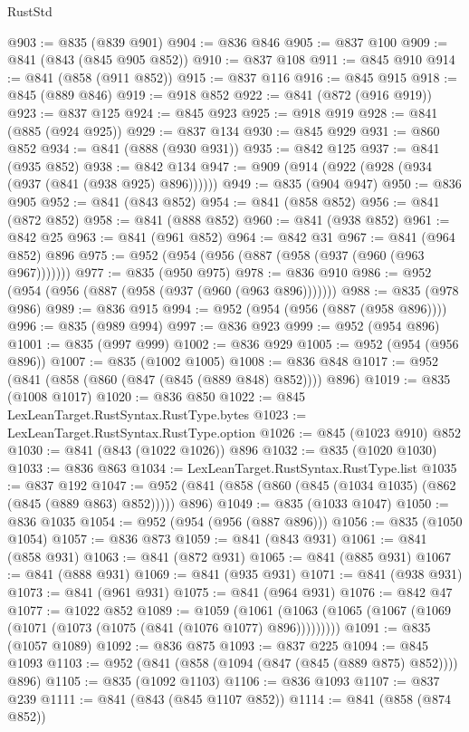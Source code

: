 \begin{lexlean}{RustStd}
\begin{coremodule}
@903 := @835 (@839 @901)
@904 := @836 @846
@905 := @837 @100
@909 := @841 (@843 (@845 @905 @852))
@910 := @837 @108
@911 := @845 @910
@914 := @841 (@858 (@911 @852))
@915 := @837 @116
@916 := @845 @915
@918 := @845 (@889 @846)
@919 := @918 @852
@922 := @841 (@872 (@916 @919))
@923 := @837 @125
@924 := @845 @923
@925 := @918 @919
@928 := @841 (@885 (@924 @925))
@929 := @837 @134
@930 := @845 @929
@931 := @860 @852
@934 := @841 (@888 (@930 @931))
@935 := @842 @125
@937 := @841 (@935 @852)
@938 := @842 @134
@947 := @909 (@914 (@922 (@928 (@934 (@937 (@841 (@938 @925) @896))))))
@949 := @835 (@904 @947)
@950 := @836 @905
@952 := @841 (@843 @852)
@954 := @841 (@858 @852)
@956 := @841 (@872 @852)
@958 := @841 (@888 @852)
@960 := @841 (@938 @852)
@961 := @842 @25
@963 := @841 (@961 @852)
@964 := @842 @31
@967 := @841 (@964 @852) @896
@975 := @952 (@954 (@956 (@887 (@958 (@937 (@960 (@963 @967)))))))
@977 := @835 (@950 @975)
@978 := @836 @910
@986 := @952 (@954 (@956 (@887 (@958 (@937 (@960 (@963 @896)))))))
@988 := @835 (@978 @986)
@989 := @836 @915
@994 := @952 (@954 (@956 (@887 (@958 @896))))
@996 := @835 (@989 @994)
@997 := @836 @923
@999 := @952 (@954 @896)
@1001 := @835 (@997 @999)
@1002 := @836 @929
@1005 := @952 (@954 (@956 @896))
@1007 := @835 (@1002 @1005)
@1008 := @836 @848
@1017 := @952 (@841 (@858 (@860 (@847 (@845 (@889 @848) @852)))) @896)
@1019 := @835 (@1008 @1017)
@1020 := @836 @850
@1022 := @845 LexLeanTarget.RustSyntax.RustType.bytes
@1023 := LexLeanTarget.RustSyntax.RustType.option
@1026 := @845 (@1023 @910) @852
@1030 := @841 (@843 (@1022 @1026)) @896
@1032 := @835 (@1020 @1030)
@1033 := @836 @863
@1034 := LexLeanTarget.RustSyntax.RustType.list
@1035 := @837 @192
@1047 := @952 (@841 (@858 (@860 (@845 (@1034 @1035) (@862 (@845 (@889 @863) @852))))) @896)
@1049 := @835 (@1033 @1047)
@1050 := @836 @1035
@1054 := @952 (@954 (@956 (@887 @896)))
@1056 := @835 (@1050 @1054)
@1057 := @836 @873
@1059 := @841 (@843 @931)
@1061 := @841 (@858 @931)
@1063 := @841 (@872 @931)
@1065 := @841 (@885 @931)
@1067 := @841 (@888 @931)
@1069 := @841 (@935 @931)
@1071 := @841 (@938 @931)
@1073 := @841 (@961 @931)
@1075 := @841 (@964 @931)
@1076 := @842 @47
@1077 := @1022 @852
@1089 := @1059
    (@1061 (@1063 (@1065 (@1067 (@1069 (@1071 (@1073 (@1075 (@841 (@1076 @1077) @896)))))))))
@1091 := @835 (@1057 @1089)
@1092 := @836 @875
@1093 := @837 @225
@1094 := @845 @1093
@1103 := @952 (@841 (@858 (@1094 (@847 (@845 (@889 @875) @852)))) @896)
@1105 := @835 (@1092 @1103)
@1106 := @836 @1093
@1107 := @837 @239
@1111 := @841 (@843 (@845 @1107 @852))
@1114 := @841 (@858 (@874 @852))

\end{coremodule}
\end{lexlean}
